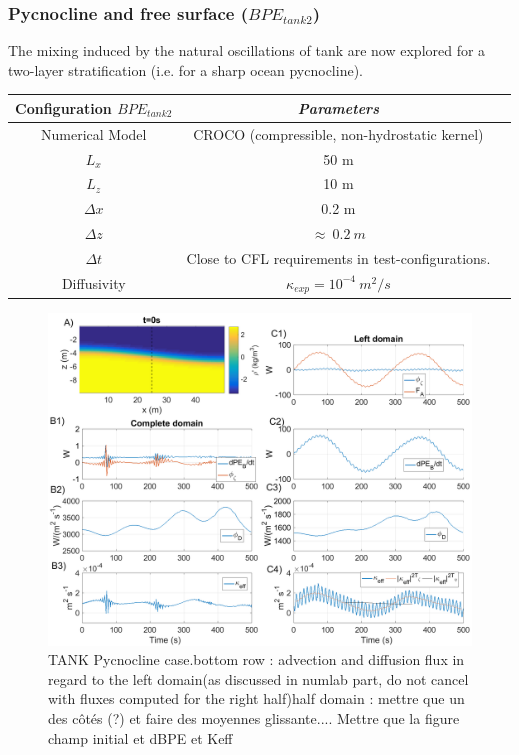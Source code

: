 \subsubsection{Pycnocline and free surface ({$BPE_{tank2}$})}
The mixing induced by the natural oscillations of tank are now explored for a two-layer stratification (i.e. for a sharp ocean pycnocline).
\begin{table}[h]
        \centering
        \begin{tabular}{|c|c|c|}
                \hline
                Configuration $BPE_{tank2}$ & \textit{Parameters}\\
                \hline 
                Numerical Model & CROCO (compressible, non-hydrostatic kernel)\\
                $L_x$ & 50 m\\
                $L_z$ & 10 m\\
                $\Delta x$ & 0.2 m\\
                $\Delta z$ & $\approx\ 0.2\ m$\\
                $\Delta t$ & Close to CFL requirements in test-configurations.\\
                Diffusivity & $\kappa_{exp} = 10^{-4} \ m^2/s$\\
                \hline
        \end{tabular}
        \label{tab_BPE_TANK2}
\end{table}
\begin{figure}[h!]
\centering
\includegraphics[width=1\textwidth]{./CHAP_BPE/Fig_TANK_pyc.png}
\caption{TANK Pycnocline case.bottom row : advection and diffusion flux in regard to the left domain(as discussed in numlab part, do not cancel with fluxes computed for the right half)\color{red}half domain : mettre que un des côtés (?) et faire des moyennes glissante.... Mettre que la figure champ initial et dBPE et Keff\color{black}}
\label{figCpsin}
\end{figure}
